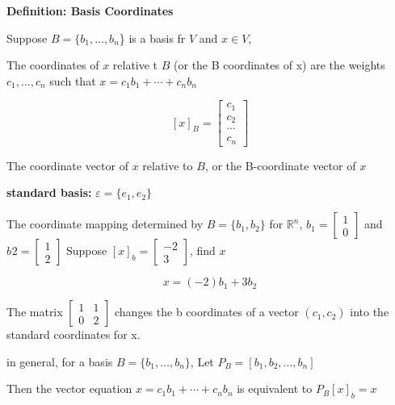 \hfill




\textbf{Definition: Basis Coordinates}

Suppose $B=\{b_{1},\ldots,b_{n}$\} is a basis fr $V$ and $x\in V$,

The coordinates of $x$ relative t $B$ (or the B coordinates of x) are the weights $c_{1},\ldots,c_{n}$ such that $x=c_{1}b_{1}+\cdots + c_{n}b_{n}$


\begin{equation}
	\label{}
	[x]_{B}=	
	\begin{bmatrix}
	c_{1}\\c_{2}\\ \cdots \\ c_{n}
	\end{bmatrix}
\end{equation}

The coordinate vector of $x$ relative to $B$, or the B-coordinate vector of $x$

\hfill

\textbf{standard basis:}
$\varepsilon = \{e_{1},e_{2}\}$


The coordinate mapping determined by $B=\{b_{1},b_{2}\}$ for $\mathbb{R}^{n}$, $b_{1}=
\begin{bmatrix}
1\\0	
\end{bmatrix}
$ and $
b_{}{2}=
\begin{bmatrix}
	1\\2
\end{bmatrix}
$
Suppose $[x]_{b}=
\begin{bmatrix}
	-2\\3
\end{bmatrix}
$, find $x$

\begin{equation}
	\label{}
	x=(-2)b_{1}+3b_{2}
\end{equation}



The matrix
$
\begin{bmatrix}
	1  & 1\\0&2	
\end{bmatrix}
$ changes the b coordinates of a vector $(c_{1},c_{2})$ into the standard coordinates for x.

in general, for a basis $B=\{b_{1},\ldots,b_{n}\}$, Let $P_{B}=[b_{1},b_{2},\ldots,b_{n}]$

\hfill

Then the vector equation $x=c_{1}b_{1}+\cdots +c_{n}b_{n}$ is equivalent to $P_{B}[x]_{b}=x$

